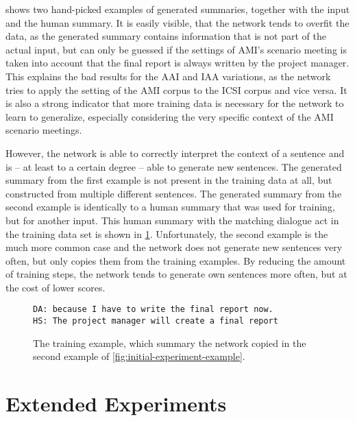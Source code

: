  shows two hand-picked examples of generated summaries, together with the input and the human summary.
It is easily visible, that the network tends to overfit the data, as the generated summary contains information that is not part of the actual input, but can only be guessed if the settings of AMI's scenario meeting is taken into account \eg that the final report is always written by the project manager.
This explains the bad results for the AAI and IAA variations, as the network tries to apply the setting of the AMI corpus to the ICSI corpus and vice versa.
It is also a strong indicator that more training data is necessary for the network to learn to generalize, especially considering the very specific context of the AMI scenario meetings.

However, the network is able to correctly interpret the context of a sentence and is -- at least to a certain degree -- able to generate new sentences.
The generated summary from the first example is not present in the training data at all, but constructed from multiple different sentences.
The generated summary from the second example is identically to a human summary that was used for training, but for another input.
This human summary with the matching dialogue act in the training data set is shown in \cref{fig:initial-experiment-training-example}.
Unfortunately, the second example is the much more common case and the network does not generate new sentences very often, but only copies them from the training examples.
By reducing the amount of training steps, the network tends to generate own sentences more often, but at the cost of lower scores.

\begin{figure}[h]
\begin{lstlisting}[numbers=none]
DA: because I have to write the final report now.
HS: The project manager will create a final report
\end{lstlisting}
\caption{The training example, which summary the network copied in the second example of \cref{fig:initial-experiment-example}.}
\label{fig:initial-experiment-training-example}
\end{figure}


\section{Extended Experiments}

